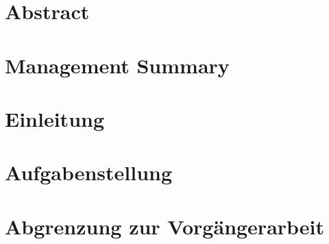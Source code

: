 







\part{Abstract}


\part{Management Summary}


\part{Einleitung}


\part{Aufgabenstellung}


\part{Abgrenzung zur Vorgängerarbeit}

%

%

%

%

%

